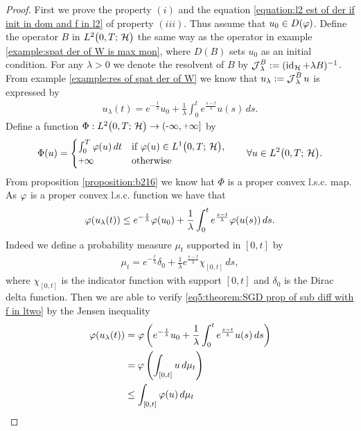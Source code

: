 \begin{proof}
	First we prove the property $ (i) $ and the equation 
	\eqref{equation:l2 est of der if init in dom and f in l2}
	of property $ (iii) $. Thus
	assume that $ u_0\in D(\varphi) $. 
	Define the operator $ B $ in $ L^{2}\big(0,T;\,\mathcal{H}\big) $
	the same way as the operator 
	in example \ref{example:spat der of W is max mon},
	where $ D(B) $ sets $ u_0 $ as an initial condition.
	For any $ \lambda >0 $ we denote the resolvent of $ B $ 
	by $ \operatorname{\mathcal{J}}_\lambda^B:=(\operatorname{\mathrm{id}}_{\mathcal{H}} + \lambda B)^{-1} $.
	From example \ref{example:res of spat der of W} we know that
	$ u_\lambda:=\operatorname{\mathcal{J}}_\lambda^B u $ is expressed by
	\begin{align*}
		u_\lambda (t)
		=e^{-\frac{t}{\lambda}}u_0
		+\frac{1}{\lambda}\int_0^t e^{\frac{s-t}{\lambda}} u(s)\,ds.
	\end{align*}
	Define a function $ \Phi:\ltwo\ra(\minus\infty,\plus\infty] $ by
	\begin{align*}
		\Phi(u)=\begin{cases}
			\int_0^T \vp(u)\,dt & \text{if }\vp(u)\in\lone,\\
			\plus\infty & \text{otherwise}
		\end{cases}
		\qquad
		\forall u\in\ltwo.
	\end{align*}
	From proposition \ref{proposition:b216} we know 
	hat $ \Phi $ is a proper convex l.s.c. map. 
	As $ \varphi $ is a 
	proper convex l.s.c. function we have
	that
	\begin{align}\label{eq5:theorem:SGD prop of sub diff with f in ltwo}
		\varphi(u_\lambda(t))\leq e^{-\frac{t}{\lambda}}\varphi(u_0)
		+\frac{1}{\lambda}\int_0^t e^{\frac{s-t}{\lambda}}\varphi(u(s))\,ds.
	\end{align}
	Indeed we define a probability measure $ \mu_t $
	supported in $ [0,t] $ by 
	\begin{align*}
		\mu_t=e^{-\frac{t}{\lambda}}\delta_0
		+\frac{1}{\lambda}e^{\frac{s-t}{\lambda}}\chi_{[0,t]}\,ds,
	\end{align*}
	where $ \chi_{[0,t]} $ is the indicator function with support
	$ [0,t] $ and $ \delta_0 $ is the Dirac delta function. 
	Then we are able to verify 
	\eqref{eq5:theorem:SGD prop of sub diff with f in ltwo}
	by the Jensen inequality
	\begin{align*}
		\vp(u_\lambda(t))
		&= \vp\left(e^{-\frac{t}{\lambda}}u_0
		+\frac{1}{\lambda}\int_0^t e^{\frac{s-t}{\lambda}} u(s)\,ds\right)\\
		&=\vp\left(\int_{[0,t]} u\,d\mu_t\right)\\
		&\leq \int_{[0,t]} \vp(u)\,d\mu_t\\

\end{align*}
\end{proof}

